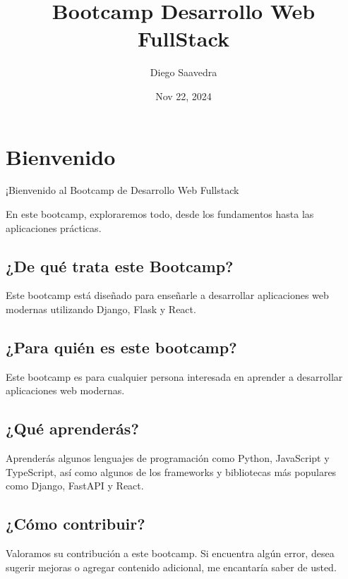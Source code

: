 \documentclass[
  a4paper,
  DIV=11,
  numbers=noendperiod,
  onepage,
  openany]{scrreprt}
\title{Bootcamp Desarrollo Web FullStack}
\author{Diego Saavedra}
\date{Nov 22, 2024}
\renewcommand*\contentsname{Table of contents}
\newcommand\contentsname{Table of contents}
\begin{document}
\maketitle

\renewcommand*\contentsname{Table of contents}
{
\hypersetup{linkcolor=}
\setcounter{tocdepth}{2}
\tableofcontents
}

\chapter{Bienvenido}\label{bienvenido}

¡Bienvenido al Bootcamp de Desarrollo Web Fullstack

En este bootcamp, exploraremos todo, desde los fundamentos hasta las
aplicaciones prácticas.

\section{¿De qué trata este
Bootcamp?}\label{de-quuxe9-trata-este-bootcamp}

Este bootcamp está diseñado para enseñarle a desarrollar aplicaciones
web modernas utilizando Django, Flask y React.

\section{¿Para quién es este
bootcamp?}\label{para-quiuxe9n-es-este-bootcamp}

Este bootcamp es para cualquier persona interesada en aprender a
desarrollar aplicaciones web modernas.

\section{¿Qué aprenderás?}\label{quuxe9-aprenderuxe1s}

Aprenderás algunos lenguajes de programación como Python, JavaScript y
TypeScript, así como algunos de los frameworks y bibliotecas más
populares como Django, FastAPI y React.

\section{¿Cómo contribuir?}\label{cuxf3mo-contribuir}

Valoramos su contribución a este bootcamp. Si encuentra algún error,
desea sugerir mejoras o agregar contenido adicional, me encantaría saber
de usted.
\end{document}

